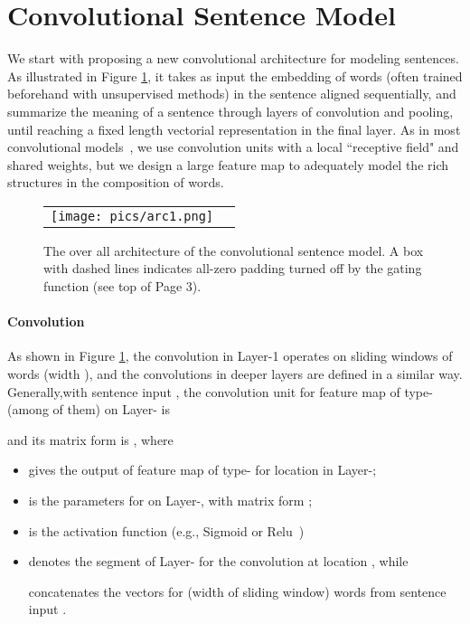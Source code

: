 \documentclass{article} \usepackage{nips14submit_e,times}
\newcommand{\0}{\ensuremath{\mathbf{0}}}
\newcommand{\1}{\ensuremath{\mathbf{1}}}
\begin{document}
\section{Convolutional Sentence Model} \label{s:senCNN} \vspace{-10pt}
We start with proposing a new convolutional architecture for modeling sentences. As illustrated in Figure \ref{f:senCNN}, it takes as input the embedding of words (often trained beforehand with unsupervised methods) in the sentence aligned sequentially, and summarize the meaning of a sentence through layers of convolution and pooling, until reaching a fixed length vectorial representation in the final layer. As in most convolutional models~\cite{cnn, cnn_speech}, we use convolution units with a local ``receptive field" and shared weights, but we design a large feature map to adequately model the rich structures in the composition of words. \vspace{-5pt}
\begin{figure}[h!]
\begin{center}
    \begin{tabular}[c]{cc}
      \texttt{[image: pics/arc1.png]} \vspace{-7pt}
\end{tabular}
    \caption{The over all architecture of the convolutional sentence model. A box with dashed lines indicates all-zero padding turned off by the gating function (see top of Page 3).}
    \label{f:senCNN}
  \end{center}
\end{figure} \vspace{-10pt}

\paragraph{Convolution} \vspace{-10pt} \label{s:convunit}
As shown in Figure \ref{f:senCNN}, the convolution in Layer-1 operates on sliding windows of words (width ), and the convolutions in deeper layers are defined in a similar way. Generally,with sentence input , the convolution unit for feature map of type- (among  of them)  on Layer- is

and its matrix form is ,
where
\begin{itemize}
  \item  gives the output of feature map of type-  for location  in Layer-;
   \item  is the parameters for  on Layer-, with matrix form ;
   \item  is the activation function (e.g., Sigmoid or Relu~\cite{relu})
  \item  denotes the segment of Layer- for the convolution at location  , while
      
      concatenates the vectors for  (width of sliding window) words from sentence input .
\end{itemize}
\end{document}
